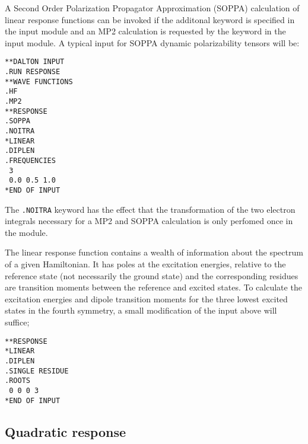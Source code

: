 A Second Order Polarization Propagator Approximation
(SOPPA)\cite{esnpjjodjcp73,jopjdycpr2,mjpekdtehjajjojcp}
calculation of linear response functions
can be invoked if the additonal keyword  is specified in the 
 input module and an MP2 calculation is requested by the 
keyword  in the  input module.  A typical input 
for SOPPA dynamic polarizability tensors  will be:
\begin{verbatim}
**DALTON INPUT
.RUN RESPONSE
**WAVE FUNCTIONS
.HF
.MP2
**RESPONSE
.SOPPA
.NOITRA
*LINEAR
.DIPLEN
.FREQUENCIES
 3
 0.0 0.5 1.0
*END OF INPUT
\end{verbatim}
The {\tt .NOITRA} keyword has the effect that the transformation of the two 
electron integrals necessary for a MP2 and SOPPA calculation is only perfomed
once in the  module.

The linear response function contains a wealth of
information about the spectrum of a given Hamiltonian. 
It has poles at the excitation
energies, 
relative to the reference state (not necessarily the ground state) and the
corresponding residues are transition
moments between the reference and
excited states. To calculate the excitation energies and dipole transition 
moments for the three lowest excited states
in the fourth symmetry, a small 
modification of the input above will suffice;
\begin{verbatim}
**RESPONSE
*LINEAR
.DIPLEN
.SINGLE RESIDUE
.ROOTS
 0 0 0 3
*END OF INPUT
\end{verbatim}

\subsection{Quadratic response}
\label{subsec:quadrsp}

